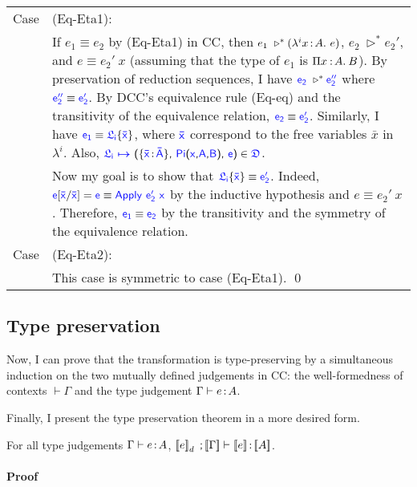 \begin{lemma}[Coherence]
\begin{longtable}{p{0.05\linewidth} p{0.95\linewidth}}
Case & (Eq-Eta1):\\
& If $e_1 \equiv e_2$ by (Eq-Eta1) in CC, then $e_1\ \triangleright^* (\lami{i}{x}{A}{e})$, $e_2\ \triangleright^* e_2'$, and $e \equiv e_2'\ x$ (assuming that the type of $e_1$ is $\Pi x\mkern1.5mu{\hspace{0.5mm}{:}\hspace{0.5mm}} A.\hspace{0.8mm}B$). By preservation of reduction sequences, I have $\target{e_2}\ \triangleright^* \target{e_2''}$ where $\target{e_2''} \equiv \target{e_2'}$. By DCC's equivalence rule (Eq-eq) and the transitivity of the equivalence relation, $\target{e_2} \equiv \target{e_2'}$. Similarly, I have $\target{e_1} \equiv \targetlab{\target{\flabel_i}}{\bar{x}}$, where $\target{\bar{x}}$ correspond to the free variables $\bar{x}$ in $\lambda^i$. Also,
$\itemdef{\target{\flabel_i}}{\itemtype{\bar{x}}{\bar{A}}}{\targetpi{x}{A}{B}}{\target{e}} \in \target{\fdef}$.
\\
& Now my goal is to show that $\targetlab{\target{\flabel_i}}{\bar{x}} \equiv \target{e_2'}$. Indeed,
$\target{e}\sub{\target{\bar{x}}}{\target{\bar{x}}} = \target{e} \equiv \targetapp{e_2'}{x}$ by the inductive hypothesis and $e \equiv e_2'\ x$. Therefore, $\target{e_1} \equiv \target{e_2}$ by the transitivity and the symmetry of the equivalence relation.
\\
Case & (Eq-Eta2):\\
& This case is symmetric to case (Eq-Eta1). \qed
\end{longtable}
\label{lem:coherence}
\end{lemma}

\subsection{Type preservation}

Now, I can prove that the transformation is type-preserving by a simultaneous induction on the two mutually defined judgements in CC: the well-formedness of contexts $\vdash \Gamma$ and the type judgement $\Gamma \vdash e \hspace{0.5mm}{:}\hspace{0.5mm} A$.

\begin{lemma}
\label{lem:type-preservation-tech}
\end{lemma}

Finally, I present the type preservation theorem in a more desired form.

\begin{theorem} For all type judgements $\Gamma \vdash e \hspace{0.5mm}{:}\hspace{0.5mm} A$, $\bbracket{e}_d\ \semicolon \bbracket{\Gamma} \vdash \bbracket{e} \goodcolon \bbracket{A}$.
\paragraph{Proof}
\label{lem:type-preservation}
\end{theorem}

